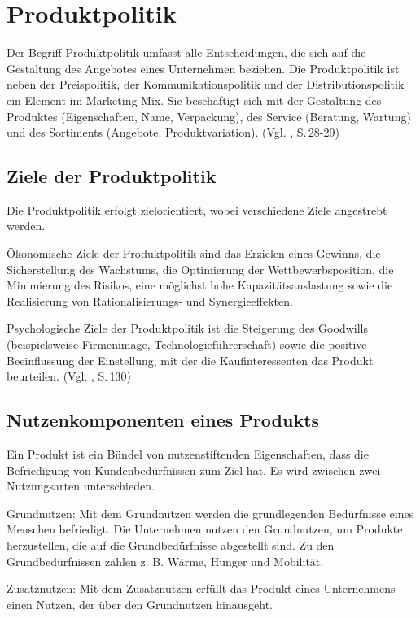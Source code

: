 \section{Produktpolitik} \label{ppoli}
    Der Begriff Produktpolitik umfasst alle Entscheidungen, die sich auf die Gestaltung des Angebotes eines Unternehmen
    beziehen. Die Produktpolitik ist neben der Preispolitik, der Kommunikationspolitik und der Distributionspolitik ein
    Element im Marketing-Mix. Sie beschäftigt sich mit der Gestaltung des Produktes (Eigenschaften, Name, Verpackung),
    des Service (Beratung, Wartung) und des Sortiments (Angebote, Produktvariation). (Vgl. \cite{Bruhn2012}, S.\,28-29)

    \subsection{Ziele der Produktpolitik}
        Die Produktpolitik erfolgt zielorientiert, wobei verschiedene Ziele angestrebt werden.

        Ökonomische Ziele der Produktpolitik sind das Erzielen eines Gewinns, die Sicherstellung des Wachstums, die
        Optimierung der Wettbewerbsposition, die Minimierung des Risikos, eine möglichst hohe Kapazitätsauslastung sowie
        die Realisierung von Rationalisierungs- und Synergieeffekten.

        Psychologische Ziele der Produktpolitik ist die Steigerung des Goodwills (beispielsweise Firmenimage,
        Technologieführerschaft) sowie die positive Beeinflussung der Einstellung, mit der die Kaufinteressenten das
        Produkt beurteilen. (Vgl. \cite{Bruhn2012}, S.\,130)

    \subsection{Nutzenkomponenten eines Produkts}
        Ein Produkt ist ein Bündel von nutzenstiftenden Eigenschaften, dass die Befriedigung von Kundenbedürfnissen zum
        Ziel hat. Es wird zwischen zwei Nutzungsarten unterschieden.

        Grundnutzen: Mit dem Grundnutzen werden die grundlegenden Bedürfnisse eines Menschen befriedigt. Die Unternehmen
        nutzen den Grundnutzen, um Produkte herzustellen, die auf die Grundbedürfnisse abgestellt sind. Zu den
        Grundbedürfnissen zählen z. B. Wärme, Hunger und Mobilität.

        Zusatznutzen: Mit dem Zusatznutzen erfüllt das Produkt eines Unternehmens einen Nutzen, der über den Grundnutzen
        hinausgeht.

